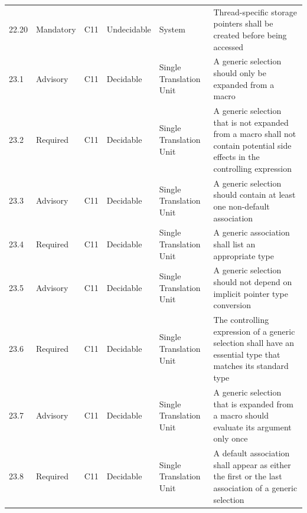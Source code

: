 \documentclass[11pt]{article}
\begin{document}
{\begin{longtable}{@{}p{1.0cm}p{1.6cm}p{1.8cm}p{2.0cm}p{1.6cm}p{7.4cm}@{}}
22.20 & Mandatory & C11 & Undecidable & System & Thread-specific storage pointers shall be created before being accessed \\
23.1 & Advisory & C11 & Decidable & Single Translation Unit & A generic selection should only be expanded from a macro \\
23.2 & Required & C11 & Decidable & Single Translation Unit & A generic selection that is not expanded from a macro shall not contain potential side effects in the controlling expression \\
23.3 & Advisory & C11 & Decidable & Single Translation Unit & A generic selection should contain at least one non-default association \\
23.4 & Required & C11 & Decidable & Single Translation Unit & A generic association shall list an appropriate type \\
23.5 & Advisory & C11 & Decidable & Single Translation Unit & A generic selection should not depend on implicit pointer type conversion \\
23.6 & Required & C11 & Decidable & Single Translation Unit & The controlling expression of a generic selection shall have an essential type that matches its standard type \\
23.7 & Advisory & C11 & Decidable & Single Translation Unit & A generic selection that is expanded from a macro should evaluate its argument only once \\
23.8 & Required & C11 & Decidable & Single Translation Unit & A default association shall appear as either the first or the last association of a generic selection \\
\end{longtable}
}
\end{document}
